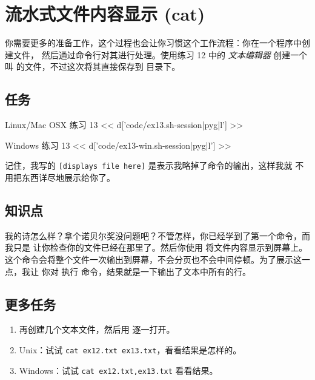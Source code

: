 \chapter{流水式文件内容显示 (cat)}

你需要更多的准备工作，这个过程也会让你习惯这个工作流程：你在一个程序中创建文件，
然后通过命令行对其进行处理。使用练习 12 中的 \emph{文本编辑器} 创建一个叫 
  的文件，不过这次将其直接保存到  目录下。

\section{任务}

\begin{code}{Linux/Mac OSX 练习 13}
<< d['code/ex13.sh-session|pyg|l'] >>
\end{code}

\begin{code}{Windows 练习 13}
<< d['code/ex13-win.sh-session|pyg|l'] >>
\end{code}

记住，我写的 \verb|[displays file here]| 是表示我略掉了命令的输出，这样我就
不用把东西详尽地展示给你了。


\section{知识点}

我的诗怎么样？拿个诺贝尔奖没问题吧？不管怎样，你已经学到了第一个命令，而我只是
让你检查你的文件已经在那里了。然后你使用  将文件内容显示到屏幕上。
这个命令会将整个文件一次输出到屏幕，不会分页也不会中间停顿。为了展示这一点，我让
你对  执行  命令，结果就是一下输出了文本中所有的行。 

\section{更多任务}

\begin{enumerate}
\item 再创建几个文本文件，然后用  逐一打开。
\item Unix：试试 \verb|cat ex12.txt ex13.txt|，看看结果是怎样的。
\item Windows：试试 \verb|cat ex12.txt,ex13.txt| 看看结果。
\end{enumerate}

